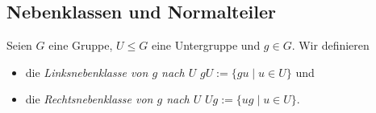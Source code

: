 
\subsection{Nebenklassen und Normalteiler}

\begin{definition}
    Seien $G$ eine Gruppe, $U \le G$ eine Untergruppe und $g \in G$. Wir definieren 
    \begin{itemize}[topsep=0cm, label={--}]
        \item die \emph{Linksnebenklasse von $g$ nach $U$} $gU := \{gu \mid u \in U\}$ und
        \item die \emph{Rechtsnebenklasse von $g$ nach $U$} $Ug := \{ug \mid u \in U\}$.
    \end{itemize}
\end{definition}

